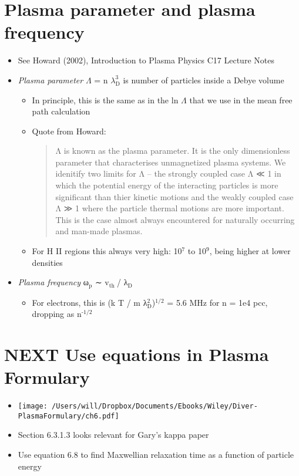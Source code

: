 \documentclass[11pt]{article}
\begin{document}
\section{Plasma parameter and plasma frequency}
\label{sec:orgheadline32}
\begin{itemize}
\item See Howard (2002), Introduction to Plasma Physics C17 Lecture Notes
\item \emph{Plasma parameter} \(\Lambda\) = n  \(\lambda_{\text{D}}^{\text{3}}\) is number of particles inside a Debye volume
\begin{itemize}
\item In principle, this is the same as in the ln \(\Lambda\) that we use in the mean free path calculation
\item Quote from Howard:
\begin{quote}
Λ is known as the plasma parameter. It is the only dimensionless parameter that characterises unmagnetized plasma systems. We idenitify two limits for Λ – the strongly coupled case Λ ≪ 1 in which the potential energy of the interacting particles is more significant than thier kinetic motions and the weakly coupled case Λ ≫ 1 where the particle thermal motions are more important. This is the case almost always encountered for naturally occurring and man-made plasmas.
\end{quote}
\item For H II regions this always very high: 10\(^{\text{7}}\) to 10\(^{\text{9}}\), being higher at lower densities
\end{itemize}
\item \emph{Plasma frequency} ω\(_{\text{p}}\) ∼ v\(_{\text{th }}\)/ λ\(_{\text{D}}\)
\begin{itemize}
\item For electrons, this is (k T / m λ\(_{\text{D}}^{\text{2}}\))\(^{\text{1/2}}\) = 5.6 MHz for n = 1e4 pcc, dropping as n\(^{\text{-1/2}}\)
\end{itemize}
\end{itemize}
\section{{\bfseries\sffamily NEXT} Use equations in Plasma Formulary}
\label{sec:orgheadline33}
\begin{itemize}
\item \texttt{[image: /Users/will/Dropbox/Documents/Ebooks/Wiley/Diver-PlasmaFormulary/ch6.pdf]}
\item Section 6.3.1.3 looks relevant for Gary's kappa paper
\item Use equation 6.8 to find Maxwellian relaxation time as a function of particle energy
\end{itemize}
\end{document}
